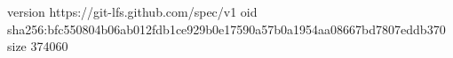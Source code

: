 version https://git-lfs.github.com/spec/v1
oid sha256:bfc550804b06ab012fdb1ce929b0e17590a57b0a1954aa08667bd7807eddb370
size 374060
